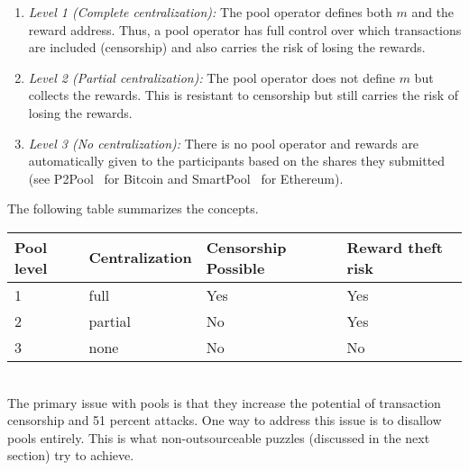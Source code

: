 \documentclass[runningheads]{llncs}
\begin{document}
\begin{enumerate}
	\item {\em Level 1 (Complete centralization):} The pool operator defines both $m$ and the reward address. Thus, a pool operator has full control over which transactions are included (censorship) and also carries the risk of losing the rewards.
	\item {\em Level 2 (Partial centralization):} The pool operator does not define $m$ but collects the rewards. This is resistant to censorship but still carries the risk of losing the rewards. %
	\item {\em Level 3 (No centralization):} There is no pool operator and rewards are automatically given to the participants based on the shares they submitted (see P2Pool~\cite{chesterman2018p2pool} for Bitcoin and SmartPool~\cite{luu2017smartpool} for Ethereum).
\end{enumerate}
The following table summarizes the concepts.\\

	\begin{tabular}{|l|l|l|l|}\hline
	Pool level	& Centralization & Censorship Possible & Reward theft risk\\\hline
	1	& full    & Yes & Yes \\
	2	& partial    & No & Yes \\
	3	& none    & No & No \\\hline
	\end{tabular}

~\\

The primary issue with pools is that they increase the potential of transaction censorship and 51 percent attacks. One way to address this issue is to disallow pools entirely. This is what non-outsourceable puzzles (discussed in the next section) try to achieve.
\end{document}
